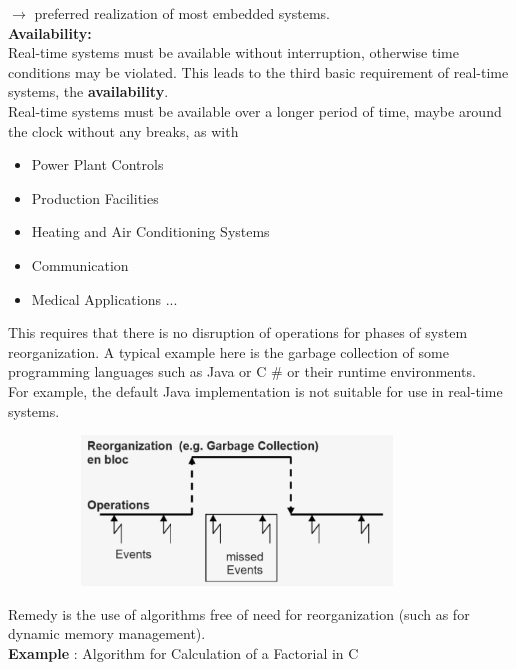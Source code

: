 $\rightarrow$ preferred realization of most embedded systems.\\

{\rot\bf  Availability: }\\

Real-time systems must be available without interruption, otherwise time conditions may be violated. This leads to the third basic requirement of real-time systems, the \textbf{availability}. \\

Real-time systems must be available over a longer period of time, maybe around the clock without any breaks, as with

\begin{itemize}
	\item  Power Plant Controls
	\item  Production Facilities
	\item  Heating and Air Conditioning Systems
	\item  Communication
	\item  Medical Applications ...
\end{itemize}

This requires that there is no disruption of operations for phases of system reorganization. A typical example here is the garbage collection of some programming languages such as Java or C \# or their runtime environments. \\

For example, the default Java implementation is not suitable for use in real-time systems. 

	\begin{figure}[h]
    \centering
    \includegraphics[width=10cm, height=4cm]{Images/image71.png}
    \label{fig:Fig }
    \end{figure}

Remedy is the use of algorithms free of need for reorganization (such as for dynamic memory management).\\

\textbf{Example }: Algorithm for Calculation of a Factorial in C 

